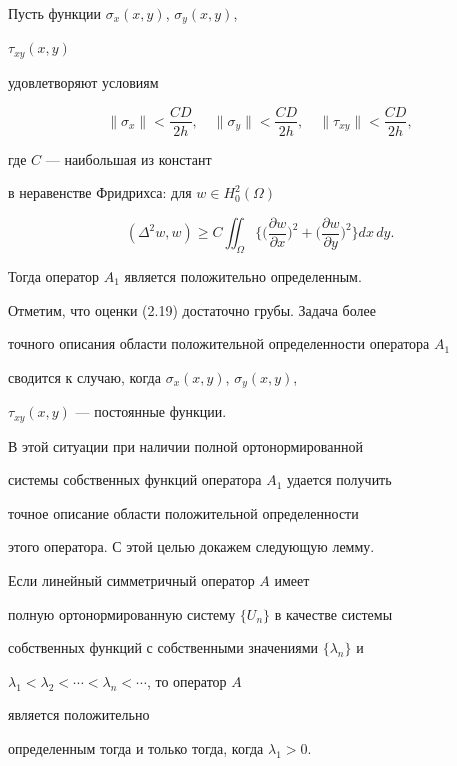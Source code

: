  


\begin{thms} Пусть функции $\sigma_x(x,y)$, $\sigma_y(x,y)$, 


$\tau_{xy}(x,y)$ 


удовлетворяют условиям 


\begin{equation} 


\|\sigma_x\|<\frac{CD}{2h},\quad \|\sigma_y\|<\frac{CD}{2h},\quad 


\|\tau_{xy}\|<\frac{CD}{2h}, 


\end{equation} 


где $C$ --- наибольшая из констант 


в неравенстве Фридрихса: для $w\in H^2_0(\Omega)$ 


$$ 


(\Delta^2w, w)\ge C\iint_\Omega\biggl\{ 


\biggl(\frac{\partial w}{\partial x}\biggr)^2+ 


\biggl(\frac{\partial w}{\partial y} \biggr)^2\biggr\}dx\,dy. 


$$ 


 


Тогда оператор $A_1$ является положительно определенным. 


\end{thms} 


 


Отметим, что оценки (2.19) достаточно грубы. Задача более 


точного описания области положительной определенности оператора $A_1$ 


сводится к случаю, когда $\sigma_x(x,y)$, $\sigma_y(x,y)$, 


$\tau_{xy}(x,y)$ --- постоянные функции. 


В этой ситуации при наличии полной ортонормированной 


системы собственных функций оператора $A_1$ удается получить 


точное описание области положительной определенности 


этого оператора. С этой целью докажем следующую лемму. 


 


\begin{lems} Если линейный симметричный оператор $A$ имеет 


полную ортонормированную систему $\{U_n\}$ в качестве системы 


собственных функций с собственными значениями $\{\lambda_n\}$ и 


$\lambda_1<\lambda_2<\dotsb<\lambda_n<\dotsb$, то оператор $A$ 


является положительно 


определенным тогда и только тогда, когда $\lambda_1>0$. 


\end{lems} 


